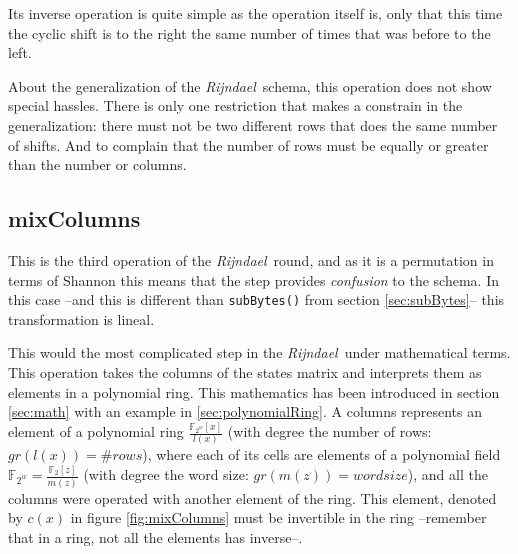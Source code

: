 \documentclass[10pt,a4paper,twoside]{llncs}
\newcommand{\todo}[1]{\texttt{\color{red}TODO:} ``\emph{#1}''}
\newcommand{\rijndael}{\emph{Rijndael}}
\newcommand{\Fpn}[2]{\ensuremath{\mathbb{F}_{#1^#2}}}
\newcommand{\Fpnm}[2]{\ensuremath{\frac{\Fpn{2}{#1}[#2]}{m(#2)}}}
\begin{document}
Its inverse operation is quite simple as the operation itself is, only that this time the cyclic shift is to the right the same number of times that was before to the left.

About the generalization of the \rijndael\, schema, this operation does not show special hassles. There is only one restriction that makes a constrain in the generalization: there must not be two different rows that does the same number of shifts. And to complain that the number of rows must be equally or greater than the number or columns.

\subsection{mixColumns}\label{sec:mixColumns}
This is the third operation of the \rijndael\, round, and as it is a permutation in terms of Shannon this means that the step provides \emph{confusion} to the schema. In this case --and this is different than {\tt subBytes()} from section \ref{sec:subBytes}-- this transformation is lineal.

This would the most complicated step in the \rijndael\, under mathematical terms. This operation takes the columns of the states matrix and interprets them as elements in a polynomial ring. This mathematics has been introduced in section \ref{sec:math} with an example in \ref{sec:polynomialRing}. A columns represents an element of a polynomial ring $\frac{\Fpn{2}{w}[x]}{l(x)}$ (with degree the number of rows: $gr(l(x))=\#rows$), where each of its cells are elements of a polynomial field $\Fpn{2}{w}=\frac{\mathbb{F}_{2}[z]}{m(z)}$  (with degree the word size: $gr(m(z))=wordsize$), and all the columns were operated with another element of the ring. This element, denoted by $c(x)$ in figure \ref{fig:mixColumns} must be invertible in the ring --remember that in a ring, not all the elements has inverse--.

\end{document}
